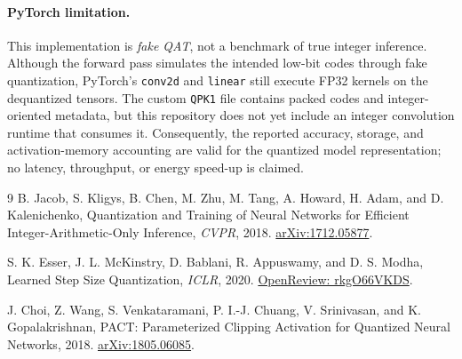 \paragraph{PyTorch limitation.} This implementation is \emph{fake QAT}, not
a benchmark of true integer inference. Although the forward pass simulates
the intended low-bit codes through fake quantization, PyTorch's
\texttt{conv2d} and \texttt{linear} still execute FP32 kernels on the
dequantized tensors. The custom \texttt{QPK1} file contains packed codes and
integer-oriented metadata, but this repository does not yet include an integer
convolution runtime that consumes it. Consequently, the reported accuracy,
storage, and activation-memory accounting are valid for the quantized model
representation; no latency, throughput, or energy speed-up is claimed.

\begin{thebibliography}{9}
B. Jacob, S. Kligys, B. Chen, M. Zhu, M. Tang, A. Howard, H. Adam, and
D. Kalenichenko, Quantization and Training of Neural Networks for Efficient
Integer-Arithmetic-Only Inference, \emph{CVPR}, 2018.
\href{https://arxiv.org/abs/1712.05877}{arXiv:1712.05877}.

S. K. Esser, J. L. McKinstry, D. Bablani, R. Appuswamy, and D. S. Modha,
Learned Step Size Quantization, \emph{ICLR}, 2020.
\href{https://openreview.net/forum?id=rkgO66VKDS}{OpenReview: rkgO66VKDS}.

J. Choi, Z. Wang, S. Venkataramani, P. I.-J. Chuang, V. Srinivasan, and
K. Gopalakrishnan, PACT: Parameterized Clipping Activation for Quantized
Neural Networks, 2018.
\href{https://arxiv.org/abs/1805.06085}{arXiv:1805.06085}.
\end{thebibliography}
